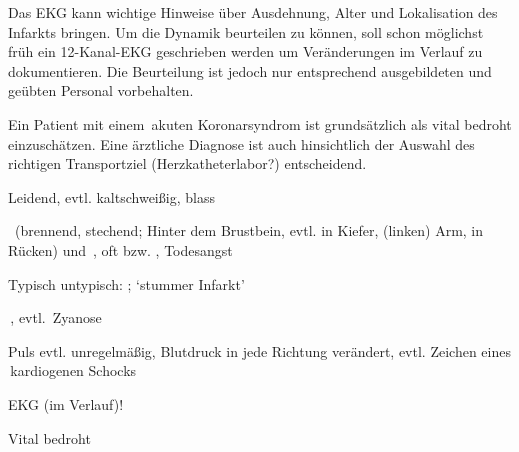 {\begin{ABCDEText}
  \item[\ABCDE{E}]  Das EKG kann wichtige Hinweise über
  Ausdehnung, Alter und Lokalisation des Infarkts bringen.
  Um die Dynamik beurteilen zu können, soll schon möglichst
  früh ein 12-Kanal-EKG geschrieben werden um Veränderungen
  im Verlauf zu dokumentieren.
  Die Beurteilung ist jedoch nur entsprechend ausgebildeten
  und geübten Personal vorbehalten.
  \item[\ABCDE{=}]  Ein Patient mit einem  {\RedFlag}\,akuten
  Koronarsyndrom ist grundsätzlich als vital bedroht
  einzuschätzen. Eine ärztliche Diagnose ist auch
  hinsichtlich der Auswahl des richtigen Transportziel
  (Herzkatheterlabor?) entscheidend.
\end{ABCDEText}
}
{
\begin{ABCDESlide}
  \item[\ABCDE{3}]  Leidend, 
  evtl. kaltschweißig, blass
  \item[\ABCDE{4}] {\RedFlag}\, (brennend, stechend;
  Hinter dem Brustbein, evtl.
    in Kiefer, (linken) Arm, in Rücken)
  und
  {\RedFlag}\,, oft  bzw.
  , Todesangst
  
 

  Typisch untypisch:
  ;  
  \enquote*{{stummer
  Infarkt}}  
  \item[\ABCDE{B}] {\RedFlag}\,, evtl. {\RedFlag}\,Zyanose
  \item[\ABCDE{C}] Puls evtl. unregelmäßig,   
  Blutdruck in jede Richtung
  verändert, evtl. Zeichen eines {\RedFlag}\,{kardiogenen Schocks}
  
  \item[\ABCDE{E}] EKG (im Verlauf)! 
  \item[\ABCDE{=}]  Vital bedroht
\end{ABCDESlide}
}
{}
{}
{}

\clearpage%

